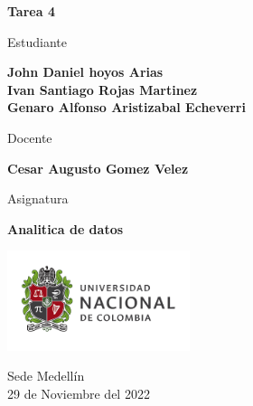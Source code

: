 \begin{titlepage}
   \Large{
   \begin{center}
       \vspace*{1cm}

       \textbf{Tarea 4}

            
       \vspace{1.1cm}
       
       Estudiante
       
       \vspace{0.5cm}
        

       \textbf{John Daniel hoyos Arias} \\

       \textbf{Ivan Santiago Rojas Martinez} \\
       
       \textbf{Genaro Alfonso Aristizabal Echeverri}




       \vspace{1cm}
       
       Docente
       
       \vspace{0.5cm}

       \textbf{Cesar Augusto Gomez Velez}
       
       \vspace{0.4cm}

       \vspace{1.4cm}
       
       Asignatura
       
       \vspace{0.5cm}

       \textbf{Analitica de datos}

       \vfill

            
       \vspace{0.4cm}
     
       \includegraphics[width=0.4\textwidth]{DocumentFormat/logounal.png}
            
       Sede Medellín\\
       29 de Noviembre del 2022
       
   \end{center}
   }
\end{titlepage}
